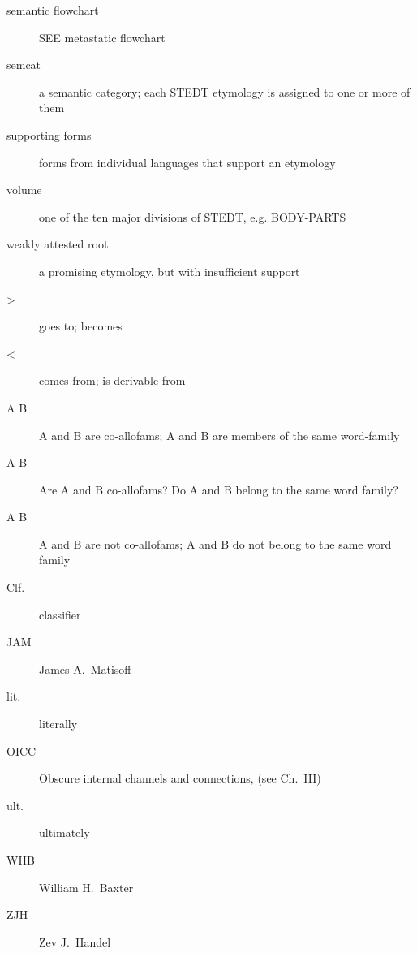 \begin{multicols}{2}
\begin{description}
\item[semantic flowchart]	SEE metastatic flowchart
\item[semcat]	a semantic category; each STEDT etymology is assigned to one or more of them
\item[supporting forms]	forms from individual languages that support an etymology
\item[volume]	one of the ten major divisions of STEDT, e.g. BODY-PARTS
\item[weakly attested root]	a promising etymology, but with insufficient support
\item[>]	goes to; becomes
\item[<]	comes from; is derivable from
\item[A  B]	A and B are co-allofams; A and B are members of the same word-family
\item[A  B]	Are A and B co-allofams? Do A and B belong to the same word family?
\item[A  B]	A and B are not co-allofams; A and B do not belong to the same word family
\item[Clf.]	classifier
\item[JAM]	James A.\ Matisoff
\item[lit.]	literally
\item[OICC]	Obscure internal channels and connections‚ (see Ch.~III)
\item[ult.]	ultimately
\item[WHB]	William H.\ Baxter
\item[ZJH]	Zev J.\ Handel
\end{description}
\end{multicols}
